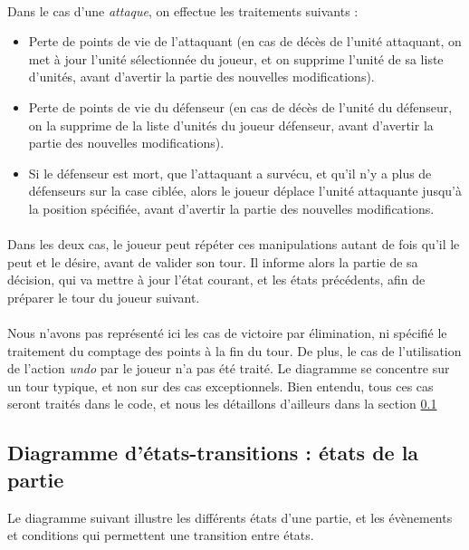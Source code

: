 \documentclass[a4paper]{article}
\begin{document}
\paragraph{}
Dans le cas d'une \textit{attaque}, on effectue les traitements suivants :
\begin{itemize}
    \item Perte de points de vie de l'attaquant (en cas de décès de l'unité attaquant, on met à jour l'unité sélectionnée du joueur, et on supprime l'unité de sa liste d'unités, avant d'avertir la partie des nouvelles modifications).
    \item Perte de points de vie du défenseur (en cas de décès de l'unité du défenseur, on la supprime de la liste d'unités du joueur défenseur, avant d'avertir la partie des nouvelles modifications).
    \item Si le défenseur est mort, que l'attaquant a survécu, et qu'il n'y a plus de défenseurs sur la case ciblée, alors le joueur déplace l'unité attaquante jusqu'à la position spécifiée, avant d'avertir la partie des nouvelles modifications.
\end{itemize}

\paragraph{}
Dans les deux cas, le joueur peut répéter ces manipulations autant de fois qu'il le peut et le désire, avant de valider son tour. Il informe alors la partie de sa décision, qui va mettre à jour l'état courant, et les états précédents, afin de préparer le tour du joueur suivant.

\paragraph{}
Nous n'avons pas représenté ici les cas de victoire par élimination, ni spécifié le traitement du comptage des points à la fin du tour. De plus, le cas de l'utilisation de l'action \textit{undo} par le joueur n'a pas été traité. Le diagramme se concentre sur un tour typique, et non sur des cas exceptionnels. Bien entendu, tous ces cas seront traités dans le code, et nous les détaillons d'ailleurs dans la section \ref{DET}



\subsection{Diagramme d'états-transitions : états de la partie}
\label{DET}
Le diagramme suivant illustre les différents états d'une partie, et les évènements et conditions qui permettent une transition entre états.
\end{document}
